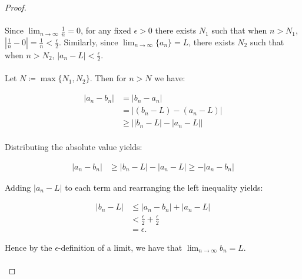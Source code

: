     \begin{proof}\ \\\\
        Since $\lim_{n \rightarrow \infty}{\frac{1}{n}} = 0$, for any fixed 
        $\epsilon > 0$ there exists $N_1$ such that when $n > N_1$,
        $|\frac{1}{n} - 0| = \frac{1}{n} < \frac{\epsilon}{2}$. Similarly,
        since $\lim_{n \rightarrow \infty}{\{a_n\}} = L$, there exists $N_2$
        such that when $n > N_2$, $|a_n - L| < \frac{\epsilon}{2}$. \\\\
        
        Let $N \coloneqq \max{\{N_1, N_2\}}$. Then for $n > N$ we have:


        \begin{align*}
            |a_n - b_n| &= |b_n - a_n| \\
                        &= |(b_n - L) - (a_n - L)| \\
                        &\ge \bigl| |b_n - L| - |a_n - L|\bigl| \\
        \end{align*}

        Distributing the absolute value yields:


        \begin{align*}
            |a_n - b_n| &\ge |b_n - L| - |a_n - L| \ge -|a_n - b_n|
        \end{align*}

        Adding $|a_n - L|$ to each term and rearranging the left inequality 
        yields:

        \begin{align*}
            |b_n - L| &\le |a_n - b_n| + |a_n - L| \\
                      &< \frac{\epsilon}{2} + \frac{\epsilon}{2} \\
                      &= \epsilon.
        \end{align*}

        Hence by the $\epsilon$-definition of a limit, we have that 
        $\lim_{n \rightarrow \infty}{b_n} = L$.
        \\\\
    \end{proof}